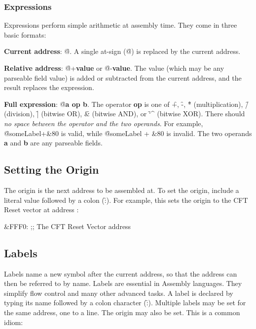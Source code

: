 \subsubsection{Expressions}

Expressions perform simple arithmetic at assembly time. They come in three basic
formats:

\begin{description}

\item{\bfseries Current address}: \f{@}. A single at-sign (\f{@}) is replaced by the
  current address.

\item{\bfseries Relative address}: \f{@+{\bfseries value}} or \f{@-{\bfseries value}}. The value
  (which may be any parseable field value) is added or subtracted from the
  current address, and the result replaces the expression.

\item{\bfseries Full expression}: \f{@{\bfseries a op b}}. The operator {\bfseries op} is one of
  \f{+}, \f{-}, \f{*} (multiplication), \f{/} (division), \f{|} (bitwise OR),
  \f{\&} (bitwise AND), or \f{\char`\^} (bitwise XOR). There should {\em no space
    between the operator and the two operands}. For example, \f{@someLabel+\&80}
  is valid, while \f{@someLabel + \&80} is invalid. The two operands {\bfseries a} and
  {\bfseries b} are any parseable fields.

\end{description}

\subsection{Setting the Origin}

The origin is the next address to be assembled at. To set the origin, include a
literal value followed by a colon (\f{:}). For example, this sets the origin to
the CFT Reset vector at address :

\begin{cftasmcode}
&FFF0:       ;; The CFT Reset Vector address
\end{cftasmcode}

\subsection{Labels}

Labels name a new symbol after the current address, so that the address can
then be referred to by name. Labels are essential in Assembly languages. They
simplify flow control and many other advanced tasks. A label is declared by
typing its name followed by a colon character (\f{:}). Multiple labels may be
set for the same address, one to a line. The origin may also be set. This is a
common idiom:

